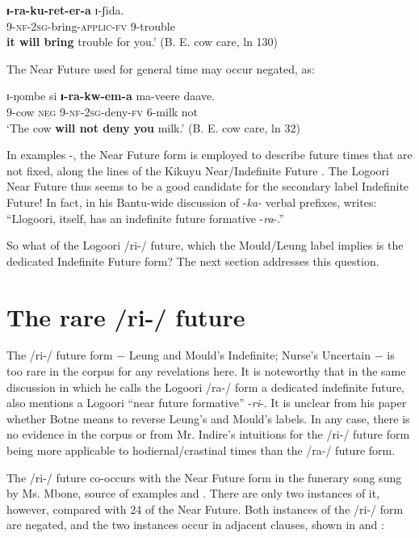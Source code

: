 \documentclass[output=paper]{langsci/langscibook}
\begin{document}
\gll \textbf{ɪ{}-ra-ku-ret-er-a}     ɪ{}-ʃida. \\
9-\textsc{nf-2sg-}bring-\textsc{applic-fv} 9-trouble \\
\glt \textbf{it will bring} trouble for you.’ (B. E. cow care, ln 130)
\z 

The Near Future used for general time may occur negated, as:

\ea\label{ex:sarvasy:8}
\gll ɪ{}-ŋombe   si  \textbf{ɪ{}-ra-kw-em-a}   ma-veere   daave. \\
9-cow  \textsc{neg}  \textsc{9-nf-2sg}{}-deny-\textsc{fv}  6-milk    not \\
\glt ‘The cow \textbf{will not deny you} milk.’ (B. E. cow care, ln 32)
\z

In examples -, the Near Future form is employed to describe future times that are not fixed, along the lines of the Kikuyu Near/Indefinite Future \citep[20]{Johnson1977}. The Logoori Near Future thus seems to be a good candidate for the secondary label Indefinite Future! In fact, in his Bantu-wide discussion of -\textit{ka- }verbal prefixes, \citet[492]{Botne1999} writes: “Llogoori, itself, has an indefinite future formative -\textit{ra}{}-.” 

So what of the Logoori /ri-/ future, which the Mould/Leung label implies is the dedicated Indefinite Future form? The next section addresses this question.

\section[The rare /ri{}-/ future]{The rare /ri-/ future}
\label{sec:sarvasy:4}

The /ri-/ future form $-$ Leung and Mould’s Indefinite; Nurse’s Uncertain $-$ is too rare in the corpus for any revelations here. It is noteworthy that in the same discussion in which he calls the Logoori /ra-/ form a dedicated indefinite future, \citet[491]{Botne1999} also mentions a Logoori “near future formative” -\textit{ri}{}-. It is unclear from his paper whether Botne means to reverse Leung’s and Mould’s labels. In any case, there is no evidence in the corpus or from Mr. Indire’s intuitions for the /ri-/ future form being more applicable to hodiernal/crastinal times than the /ra-/ future form.

The /ri-/ future co-occurs with the Near Future form in the funerary song sung by Ms. Mbone, source of examples  and . There are only two instances of it, however, compared with 24 of the Near Future. Both instances of the /ri-/ form are negated, and the two instances occur in adjacent clauses, shown in  and :
\end{document}
